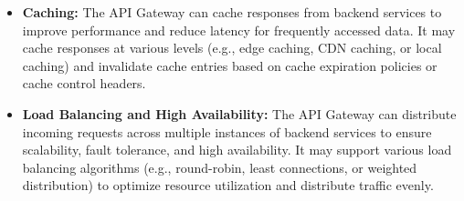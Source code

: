 \documentclass{article}
\begin{document}
\begin{itemize}
    \item \textbf{Caching:} The API Gateway can cache responses from backend services to improve performance and reduce latency for frequently accessed data. It may cache responses at various levels (e.g., edge caching, CDN caching, or local caching) and invalidate cache entries based on cache expiration policies or cache control headers.
    \item \textbf{Load Balancing and High Availability:} The API Gateway can distribute incoming requests across multiple instances of backend services to ensure scalability, fault tolerance, and high availability. It may support various load balancing algorithms (e.g., round-robin, least connections, or weighted distribution) to optimize resource utilization and distribute traffic evenly.
\end{itemize}
\end{document}
